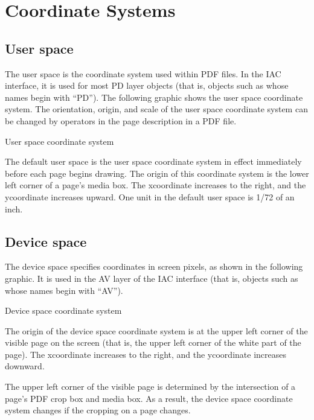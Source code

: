 \documentclass[letterpaper,12pt,english,openany,oneside]{sphinxmanual}
\begin{document}
\chapter{Coordinate Systems}
\label{\detokenize{IAC_API_CoordinateSystems:coordinate-systems}}\label{\detokenize{IAC_API_CoordinateSystems::doc}}

\section{User space}
\label{\detokenize{IAC_API_CoordinateSystems:user-space}}
The user space is the coordinate system used within PDF files. In the IAC interface, it is used for most PD layer objects (that is, objects such as  whose names begin with “PD”). The following graphic shows the user space coordinate system. The orientation, origin, and scale of the user space coordinate system can be changed by operators in the page description in a PDF file.

User space coordinate system

\noindent{}

The default user space is the user space coordinate system in effect immediately before each page begins drawing. The origin of this coordinate system is the lower left corner of a page’s media box. The x\sphinxhyphen{}coordinate increases to the right, and the y\sphinxhyphen{}coordinate increases upward. One unit in the default user space is 1/72 of an inch.


\section{Device space}
\label{\detokenize{IAC_API_CoordinateSystems:device-space}}
The device space specifies coordinates in screen pixels, as shown in the following graphic. It is used in the AV layer of the IAC interface (that is, objects such as  whose names begin with “AV”).

Device space coordinate system

\noindent{}

The origin of the device space coordinate system is at the upper left corner of the visible page on the screen (that is, the upper left corner of the white part of the page). The x\sphinxhyphen{}coordinate increases to the right, and the y\sphinxhyphen{}coordinate increases downward.

The upper left corner of the visible page is determined by the intersection of a page’s PDF crop box and media box. As a result, the device space coordinate system changes if the cropping on a page changes.



\renewcommand{\indexname}{Index}
\printindex
\end{document}
